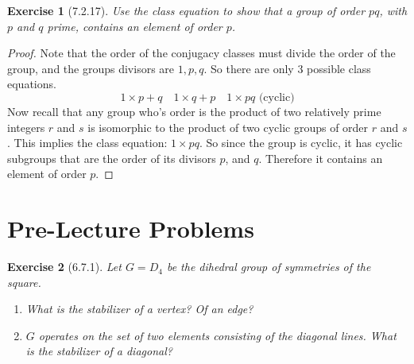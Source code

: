 \documentclass[12pt]{article}
\newtheorem*{exer}{Exercise}
\begin{document}

\begin{exer}[7.2.17]
    Use the class equation to show that a group of order $pq$, with $p$
    and $q$ prime, contains an element of order $p$.
\end{exer}

\begin{proof}

    Note that the order of the conjugacy classes must divide the order
    of the group, and the groups divisors are $1, p, q$. So there are
    only 3 possible class equations.
    \[
        1 \times p + q \quad 1 \times q + p \quad 1 \times pq
        \text{ (cyclic)}
    \]
    Now recall that any group who's order is the product of two relatively
    prime integers $r$ and $s$ is isomorphic to the product of two
    cyclic groups of order $r$ and $s$. This implies the class equation:
    $1 \times pq$. So since the group is cyclic, it has cyclic subgroups
    that are the order of its divisors $p$, and $q$. Therefore it
    contains an element of order $p$.

    



\end{proof}

\section*{Pre-Lecture Problems}

\begin{exer}[6.7.1]
    Let $G = D_4$ be the dihedral group of symmetries of the square.
    \begin{enumerate}
        \item What is the stabilizer of a vertex? Of an edge?
        \item $G$ operates on the set of two elements consisting of the
            diagonal lines. What is the stabilizer of a diagonal?
    \end{enumerate}
\end{exer}
\end{document}
